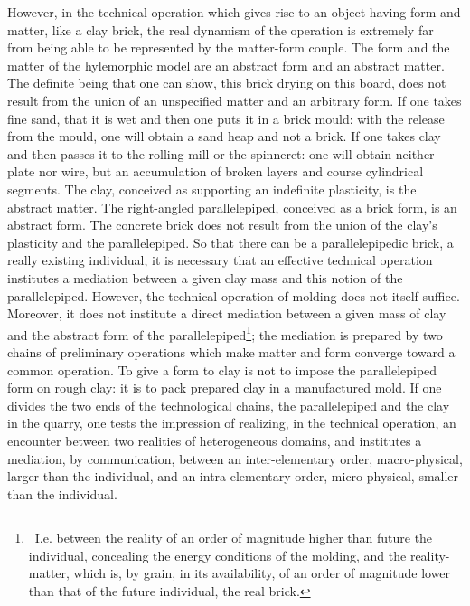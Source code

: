 \documentclass[a4paper]{article}
\begin{document}
However, in the technical operation which gives rise to an object having form and matter, like a clay brick, the real dynamism of the operation is extremely far from being able to be represented by the matter-form couple. The form and the matter of the hylemorphic model are an abstract form and an abstract matter. The definite being that one can show, this brick drying on this board, does not result from the union of an unspecified matter and an arbitrary form. If one takes fine sand, that it is wet and then one puts it in a brick mould: with the release from the mould, one will obtain a sand heap and not a brick. If one takes clay and then passes it to the rolling mill or the spinneret: one will obtain neither plate nor wire, but an accumulation of broken layers and course cylindrical segments. The clay, conceived as supporting an indefinite plasticity, is the abstract matter. The right-angled parallelepiped, conceived as a brick form, is an abstract form. The concrete brick does not result from the union of the clay’s plasticity and the parallelepiped. So that there can be a parallelepipedic brick, a really existing individual, it is necessary that an effective technical operation institutes a mediation between a given clay mass and this notion of the parallelepiped. However, the technical operation of molding does not itself suffice. Moreover, it does not institute a direct mediation between a given mass of clay and the abstract form of the parallelepiped\footnote{\ I.e. between the reality of an order of magnitude higher than future the individual, concealing the energy conditions of the molding, and the reality-matter, which is, by grain, in its availability, of an order of magnitude lower than that of the future individual, the real brick.}; the mediation is prepared by two chains of preliminary operations which make matter and form converge toward a common operation. To give a form to clay is not to impose the parallelepiped form on rough clay: it is to pack prepared clay in a manufactured mold. If one divides the two ends of the technological chains, the parallelepiped and the clay in the quarry, one tests the impression of realizing, in the technical operation, an encounter between two realities of heterogeneous domains, and institutes a mediation, by communication, between an inter-elementary order, macro-physical, larger than the individual, and an intra-elementary order, micro-physical, smaller than the individual.
\end{document}
